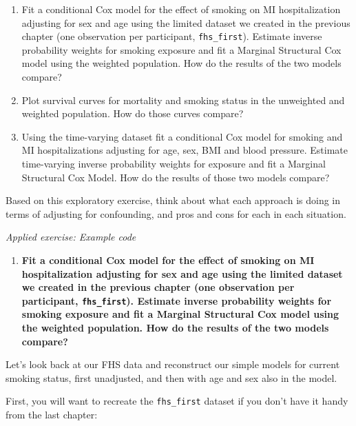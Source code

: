 \documentclass[
]{book}
\providecommand{\tightlist}{%
  \setlength{\itemsep}{0pt}\setlength{\parskip}{0pt}}
\begin{document}
\begin{enumerate}
\def\labelenumi{\arabic{enumi}.}
\tightlist
\item
  Fit a conditional Cox model for the effect of smoking on MI hospitalization adjusting for sex and age using the limited dataset we created in the previous chapter (one observation per participant, \texttt{fhs\_first}). Estimate inverse probability weights for smoking exposure and fit a Marginal Structural Cox model using the weighted population. How do the results of the two models compare?
\item
  Plot survival curves for mortality and smoking status in the unweighted and weighted population. How do those curves compare?
\item
  Using the time-varying dataset fit a conditional Cox model for smoking and MI hospitalizations adjusting for age, sex, BMI and blood pressure. Estimate time-varying inverse probability weights for exposure and fit a Marginal Structural Cox Model. How do the results of those two models compare?
\end{enumerate}

Based on this exploratory exercise, think about what each approach is doing in terms of adjusting for confounding, and pros and cons for each in each situation.

\emph{Applied exercise: Example code}

\begin{enumerate}
\def\labelenumi{\arabic{enumi}.}
\tightlist
\item
  \textbf{Fit a conditional Cox model for the effect of smoking on MI hospitalization adjusting for sex and age using the limited dataset we created in the previous chapter (one observation per participant, \texttt{fhs\_first}). Estimate inverse probability weights for smoking exposure and fit a Marginal Structural Cox model using the weighted population. How do the results of the two models compare?}
\end{enumerate}

Let's look back at our FHS data and reconstruct our simple models for current smoking status, first unadjusted, and then with age and sex also in the model.

First, you will want to recreate the \texttt{fhs\_first} dataset if you don't have it handy from the last chapter:
\end{document}
